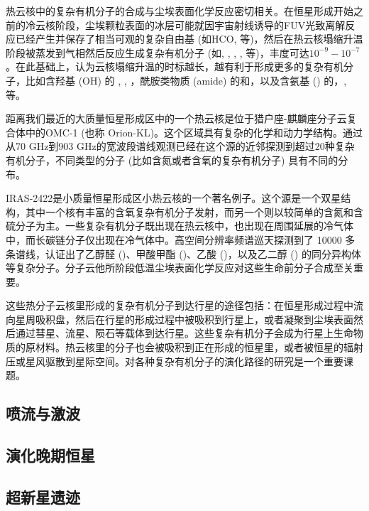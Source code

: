 \documentclass[a4paper]{article}
\newcommand\irassixteen{IRAS\;16293-2422}
\begin{document}
热云核中的复杂有机分子的合成与尘埃表面化学反应密切相关。在恒星形成开始之前的冷云核阶段，尘埃颗粒表面的冰层可能就因宇宙射线诱导的FUV光致离解反应已经产生并保存了相当可观的复杂自由基 (如HCO, 等)，然后在热云核塌缩升温阶段被蒸发到气相然后反应生成复杂有机分子 (如, , , , 等)，丰度可达$10^{-9}-10^{-7}$。在此基础上，\citet{Garrod2008}认为云核塌缩升温的时标越长，越有利于形成更多的复杂有机分子，比如含羟基 (OH) 的 , , ，酰胺类物质 (amide) 的和，以及含氨基 () 的，, 等。

距离我们最近的大质量恒星形成区中的一个热云核是位于猎户座-麒麟座分子云复合体中的OMC-1 (也称 Orion-KL)。这个区域具有复杂的化学和动力学结构。通过从70 GHz到903 GHz的宽波段谱线观测已经在这个源的近邻探测到超过20种复杂有机分子，不同类型的分子 (比如含氮或者含氧的复杂有机分子) 具有不同的分布。

\irassixteen 是小质量恒星形成区小热云核的一个著名例子。这个源是一个双星结构，其中一个核有丰富的含氧复杂有机分子发射，而另一个则以较简单的含氮和含硫分子为主。一些复杂有机分子既出现在热云核中，也出现在周围延展的冷气体中，而长碳链分子仅出现在冷气体中。高空间分辨率频谱巡天探测到了 10000 多条谱线，认证出了乙醇醛 ()、甲酸甲酯 ()、乙酸 ()，以及乙二醇 () 的同分异构体等复杂分子。分子云他所阶段低温尘埃表面化学反应对这些生命前分子合成至关重要。

这些热分子云核里形成的复杂有机分子到达行星的途径包括：在恒星形成过程中流向星周吸积盘，然后在行星的形成过程中被吸积到行星上，或者凝聚到尘埃表面然后通过彗星、流星、陨石等载体到达行星。这些复杂有机分子会成为行星上生命物质的原材料。热云核里的分子也会被吸积到正在形成的恒星里，或者被恒星的辐射压或星风驱散到星际空间。对各种复杂有机分子的演化路径的研究是一个重要课题。

\subsection{喷流与激波}

\subsection{演化晚期恒星}

\subsection{超新星遗迹}
\end{document}
